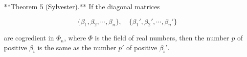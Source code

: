 **Theorem 5 (Sylvester).** If the diagonal matrices

$$\{\beta_1, \beta_2, \cdots, \beta_n\}, \quad \{\beta_1', \beta_2', \cdots, \beta_n'\}$$

are cogredient in $\Phi_n$, where $\Phi$ is the field of real numbers, then the number $p$ of positive $\beta_i$ is the same as the number $p'$ of positive $\beta_i'$.
